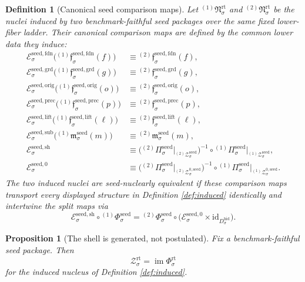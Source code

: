 \documentclass[11pt]{article}
\newcommand{\HiddenBody}[1]{D_{#1}^{\mathrm{hid}}}
\newcommand{\SeedProj}[1]{\Pi_{#1}^{\mathrm{seed}}}
\newcommand{\SeedFoundMin}[1]{\mathfrak f_{#1}^{\mathrm{seed,fdn}}}
\newcommand{\SeedGroundMin}[1]{\mathfrak f_{#1}^{\mathrm{seed,grd}}}
\newcommand{\SeedOrigMin}[1]{\mathfrak f_{#1}^{\mathrm{seed,orig}}}
\newcommand{\SeedPrecMin}[1]{\mathfrak f_{#1}^{\mathrm{seed,prec}}}
\newcommand{\SeedLiftMin}[1]{\mathfrak f_{#1}^{\mathrm{seed,lift}}}
\newcommand{\SeedSubMin}[1]{\mathfrak m_{#1}^{\mathrm{seed}}}
\newcommand{\SeedShellSet}[1]{\mathcal Z_{#1}^{\mathrm{seed}}}
\newcommand{\SeedZeroCore}[1]{\mathcal Z_{#1}^{0,\mathrm{seed}}}
\newcommand{\SeedSplit}[1]{\Phi_{#1}^{\mathrm{seed}}}
\newcommand{\RootNucleus}[1]{\mathfrak N_{#1}^{\mathrm{rt}}}
\newcommand{\RootShellSet}[1]{\mathcal Z_{#1}^{\mathrm{rt}}}
\newcommand{\RootSplit}[1]{\Phi_{#1}^{\mathrm{rt}}}
\newcommand{\SeedMapFound}[1]{\mathcal E_{#1}^{\mathrm{seed,fdn}}}
\newcommand{\SeedMapGround}[1]{\mathcal E_{#1}^{\mathrm{seed,grd}}}
\newcommand{\SeedMapOrig}[1]{\mathcal E_{#1}^{\mathrm{seed,orig}}}
\newcommand{\SeedMapPrec}[1]{\mathcal E_{#1}^{\mathrm{seed,prec}}}
\newcommand{\SeedMapLift}[1]{\mathcal E_{#1}^{\mathrm{seed,lift}}}
\newcommand{\SeedMapSub}[1]{\mathcal E_{#1}^{\mathrm{seed,sub}}}
\newcommand{\SeedMapShell}[1]{\mathcal E_{#1}^{\mathrm{seed,sh}}}
\newcommand{\SeedMapZero}[1]{\mathcal E_{#1}^{\mathrm{seed},0}}
\newtheorem{definition}{Definition}
\newtheorem{proposition}{Proposition}
\begin{document}
\begin{definition}[Canonical seed comparison maps]
\label{def:equiv}
Let \({}^{(1)}\!\RootNucleus{\sigma}\) and \({}^{(2)}\!\RootNucleus{\sigma}\) be the nuclei induced by two benchmark-faithful seed packages over the same fixed lower-fiber ladder. Their canonical comparison maps are defined by the common lower data they induce:
\begin{align}
\SeedMapFound{\sigma}\bigl({}^{(1)}\!\SeedFoundMin{\sigma}(f)\bigr)
&\equiv
{}^{(2)}\!\SeedFoundMin{\sigma}(f),
\\
\SeedMapGround{\sigma}\bigl({}^{(1)}\!\SeedGroundMin{\sigma}(g)\bigr)
&\equiv
{}^{(2)}\!\SeedGroundMin{\sigma}(g),
\\
\SeedMapOrig{\sigma}\bigl({}^{(1)}\!\SeedOrigMin{\sigma}(o)\bigr)
&\equiv
{}^{(2)}\!\SeedOrigMin{\sigma}(o),
\\
\SeedMapPrec{\sigma}\bigl({}^{(1)}\!\SeedPrecMin{\sigma}(p)\bigr)
&\equiv
{}^{(2)}\!\SeedPrecMin{\sigma}(p),
\\
\SeedMapLift{\sigma}\bigl({}^{(1)}\!\SeedLiftMin{\sigma}(\ell)\bigr)
&\equiv
{}^{(2)}\!\SeedLiftMin{\sigma}(\ell),
\\
\SeedMapSub{\sigma}\bigl({}^{(1)}\!\SeedSubMin{\sigma}(m)\bigr)
&\equiv
{}^{(2)}\!\SeedSubMin{\sigma}(m),
\\
\SeedMapShell{\sigma}
&\equiv
\bigl({}^{(2)}\!\SeedProj{\sigma}\big|_{{}^{(2)}\!\SeedShellSet{\sigma}}\bigr)^{-1}
\circ
{}^{(1)}\!\SeedProj{\sigma}\big|_{{}^{(1)}\!\SeedShellSet{\sigma}},
\\
\SeedMapZero{\sigma}
&\equiv
\bigl({}^{(2)}\!\SeedProj{\sigma}\big|_{{}^{(2)}\!\SeedZeroCore{\sigma}}\bigr)^{-1}
\circ
{}^{(1)}\!\SeedProj{\sigma}\big|_{{}^{(1)}\!\SeedZeroCore{\sigma}}.
\end{align}
The two induced nuclei are \emph{seed-nuclearly equivalent} if these comparison maps transport every displayed structure in Definition \ref{def:induced} identically and intertwine the split maps via
\[
\SeedMapShell{\sigma}\circ{}^{(1)}\!\SeedSplit{\sigma}
=
{}^{(2)}\!\SeedSplit{\sigma}\circ
\bigl(\SeedMapZero{\sigma}\times\mathrm{id}_{\HiddenBody{\sigma}}\bigr).
\]
\end{definition}

\begin{proposition}[The shell is generated, not postulated]
\label{prop:shell}
Fix a benchmark-faithful seed package. Then
\[
\RootShellSet{\sigma}
=
\operatorname{im}\RootSplit{\sigma}
\]
for the induced nucleus of Definition \ref{def:induced}.
\end{proposition}
\end{document}
